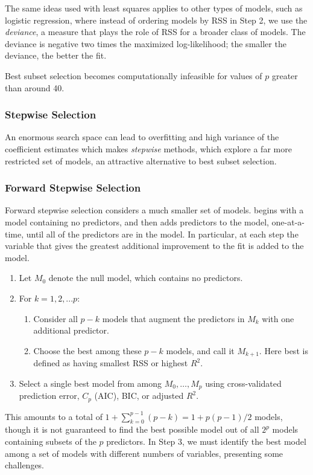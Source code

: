 \documentclass{article}
\numberwithin{equation}{section}
\begin{document}
\begin{enumerate}
The same ideas used with least squares applies to other types of models, such as logistic regression, where instead of ordering models by RSS in Step 2, we use the \textit{deviance}, a measure that plays the role of RSS for a broader class of models. The deviance is negative two times the maximized log-likelihood; the smaller the deviance, the better the fit. 

Best subset selection becomes computationally infeasible for values of $p$ greater than around 40.

\subsubsection{Stepwise Selection}
An enormous search space can lead to overfitting and high variance of the coefficient estimates which makes \textit{stepwise} methods, which explore a far more restricted set of models, an attractive alternative to best subset selection.

\subsubsection*{Forward Stepwise Selection}
Forward stepwise selection considers a much smaller set of models. begins with a model containing no predictors, and then adds predictors to the model, one-at-a-time, until all of the predictors are in the model. In particular, at each step the variable that gives the greatest additional improvement to the fit is added to the model.
\begin{enumerate}
    \item Let $M_0$ denote the null model, which contains no predictors.
    \item For $k = 1, 2,...p$:
    \begin{enumerate}
        \item Consider all $p - k$ models that augment the predictors in $M_k$ with one additional predictor.
        \item  Choose the best among these $p - k$ models, and call it $M_{k+1}$. Here best is defined as having smallest RSS or highest $R^2$.
    \end{enumerate}
    \item Select a single best model from among $M_0,\dots,M_p$ using cross-validated prediction error, $C_p$ (AIC), BIC, or adjusted $R^2$.
\end{enumerate}

This amounts to a total of $1 +\sum_{k=0}^{p-1} (p-k) = 1 + p(p-1)/2$ models, though it is not guaranteed to find the best possible model out of all $2^p$ models containing subsets of the $p$ predictors.  In Step 3, we must identify the best model among a set of models with different numbers of variables, presenting some challenges.


\end{enumerate}
\end{document}
